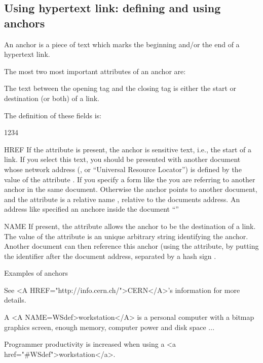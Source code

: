 \subsection{Using hypertext link: defining and using anchors}

An anchor is a piece of text which marks the beginning and/or the
end of a hypertext link.   
   
The most two most important attributes of an anchor are:

\begin{XMP}
\end{XMP}

The text between the opening tag 
and the closing tag  is either the
start or destination (or both) of a link. 

The definition of these fields is:

\begin{DLtt}{1234}
\item[HREF] If the  attribute is present,
            the anchor is sensitive text, i.e., the start of a link. 
            If you select this text, you should be presented 
            with another document whose network address (\URL, or ``Universal 
            Resource Locator'') is defined by the value
            of the  attribute . 
            If you specify a form like 
            the you are referring to another anchor in the same document.
            Otherwise the anchor points to another document, and
            the attribute is a relative name , relative to
            the documents address. 
            An address like  specified an anchore
            inside the document ``''
\item[NAME] If present, the  attribute 
            allows the anchor to be the destination of a link.
            The value of the attribute is an unique arbitrary 
            string identifying the anchor.
            Another document can then reference this anchor (using the 
             attribute,  by putting the identifier after the
            document address, separated by a hash sign . 
\end{DLtt}                         
\begin{XMPt}{Examples of anchors}

See <A HREF="http://info.cern.ch/">CERN</A>'s information for more details.

A <A NAME=WSdef>workstation</A> is a personal computer with a bitmap graphics 
screen, enough memory, computer power and disk space ...

Programmer productivity is increased when using a <a href="#WSdef">workstation</a>.
\end{XMPt}

